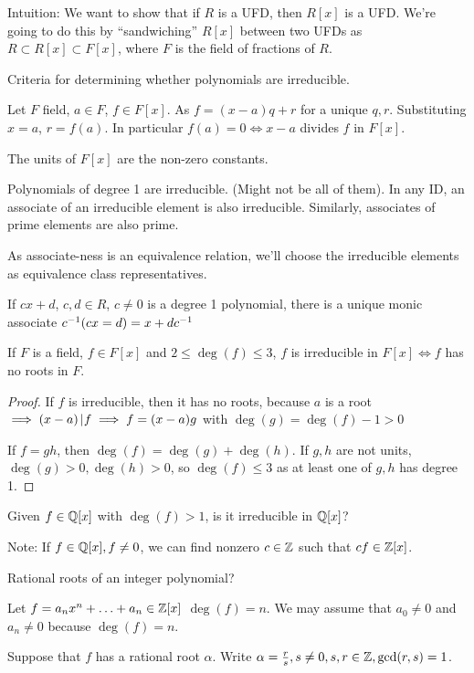 \documentclass[notes.tex]{subfiles}
\begin{document}

Intuition: We want to show that if $R$ is a UFD, then $R[x]$ is a UFD.
We're going to do this by ``sandwiching'' $R[x]$ between two UFDs as $R \subset R[x] \subset F[x]$, where $F$ is the field of fractions of $R$.

Criteria for determining whether polynomials are irreducible.

Let $F$ field, $a\in F$, $f\in F[x]$. 
As $f = (x-a)q + r$ for a unique $q, r$.
Substituting $x=a$, $r = f(a)$. In particular $f(a) = 0 \iff x-a$ divides $f$ in $F[x]$.

The units of $F[x]$ are the non-zero constants.

Polynomials of degree 1 are irreducible. (Might not be all of them).
In any ID, an associate of an irreducible element is also irreducible. Similarly, associates of prime elements are also prime.

As associate-ness is an equivalence relation, we'll choose the irreducible elements as equivalence class representatives.

If $cx + d$, $c, d\in R$, $c\ne 0$ is a degree 1 polynomial, there is a unique monic associate ${c}^{-1}(cx = d) = x + d{c}^{-1}$

\begin{proposition}
	If $F$ is a field, $f\in F[x]$ and $2\le \deg(f) \le 3$, $f$ is irreducible in $F[x] \iff f$ has no roots in $F$.
\end{proposition}
\begin{proof}
	If $f$ is irreducible, then it has no roots, because $a$ is a root $\implies (x-a)\mkern2mu|\mkern1mu f \implies f = (x-a )g$ with $\deg(g) = \deg(f)-1 > 0$

	If $f=gh$, then $\deg(f) = \deg(g) + \deg(h)$.
	If $g, h$ are not units, $\deg(g) > 0, \deg(h)>0$, so $\deg(f)\le 3$ as at least one of $g, h$ has degree 1.
\end{proof}

Given $f\in \mathbb{Q}[x]$ with $\deg(f) > 1$, is it irreducible in $\mathbb{Q}[x]$?

Note: If $f\in \mathbb{Q}[x], f\ne 0$, we can find nonzero $c\in \mathbb{Z}$ such that $cf \in \mathbb{Z}[x]$.

Rational roots of an integer polynomial?

Let $f = a_nx^n + \ldots + a_n \in\mathbb{Z}[x]$
$\deg(f)=n$. We may assume that $a_0\ne 0$ and $a_n \ne 0$ because $\deg(f) = n$.

Suppose that $f$ has a rational root $\alpha$. Write $\alpha=\frac{r}{s}, s\ne 0, s, r\in \mathbb{Z}, \gcd(r, s) = 1$.
\end{document}
